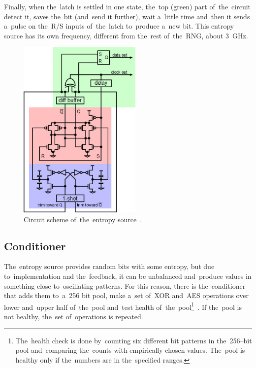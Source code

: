 \par{
Finally, when the~latch is settled in one state, the~top (green) part 
of~the~circuit detect it, saves the~bit (and~send it further), wait 
a~little time and~then it sends a~pulse on the~R/S inputs of~the~latch 
to~produce a~new bit. This entropy source has its own frequency, different 
from the~rest of~the~RNG, about 3~GHz.
}
\begin{figure}[h!]
  \centering
 \includegraphics[width=6cm,keepaspectratio]{fig/entropy-source-circuit} %
\caption{Circuit scheme of~the~entropy source~\cite{UnderstandingRdRandElectronic}. }
\label{fig:ES-circuit}
\end{figure}

\subsection{Conditioner}
\par{
The~entropy source provides random bits with some entropy, 
but due to~implementation and the~feedback, it can be unbalanced 
and~produce values in something close to~oscillating patterns. 
For this reason, there is the~conditioner that adds them to~a~256 bit pool, 
make a~set of~XOR and~AES operations over lower and~upper half of~the~pool 
and~test health of~the~pool\footnote{The~health check is done by~counting six 
different bit patterns in the~256--bit pool and~comparing the~counts 
with empirically chosen values. The~pool is healthy only if the~numbers are 
in the~specified ranges.
}~\cite{AnalysisOfDRNG,UnderstandingRdRandElectronic}. 
If the~pool is not healthy, the~set of~operations is repeated. 
}

